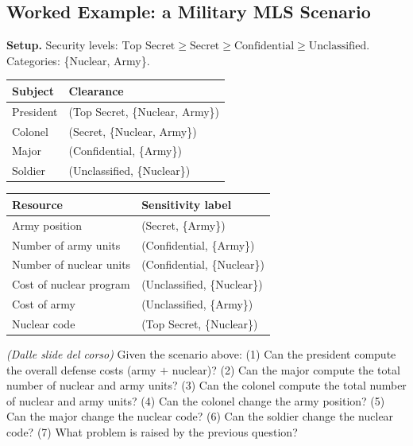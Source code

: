 \documentclass[12pt, a4paper]{article}
\newcounter{esercizio}[section]
\begin{document}
\subsection{Worked Example: a Military MLS Scenario}
\textbf{Setup.} Security levels: $\text{Top Secret} \geq \text{Secret} \geq \text{Confidential} \geq \text{Unclassified}$. Categories: \{Nuclear, Army\}.
\begin{center}
\begin{tabular}{@{}ll@{}}
\toprule
\textbf{Subject} & \textbf{Clearance} \\
\midrule
President & (Top Secret, \{Nuclear, Army\}) \\
Colonel & (Secret, \{Nuclear, Army\}) \\
Major & (Confidential, \{Army\}) \\
Soldier & (Unclassified, \{Nuclear\}) \\
\bottomrule
\end{tabular}
\qquad
\begin{tabular}{@{}ll@{}}
\toprule
\textbf{Resource} & \textbf{Sensitivity label} \\
\midrule
Army position & (Secret, \{Army\}) \\
Number of army units & (Confidential, \{Army\}) \\
Number of nuclear units & (Confidential, \{Nuclear\}) \\
Cost of nuclear program & (Unclassified, \{Nuclear\}) \\
Cost of army & (Unclassified, \{Army\}) \\
Nuclear code & (Top Secret, \{Nuclear\}) \\
\bottomrule
\end{tabular}
\end{center}

\begin{tcolorbox}[colback=lightergray!10, colframe=tocsec, title=\textbf{Esercizio \theesercizio}]
\textit{(Dalle slide del corso)} Given the scenario above: (1) Can the president compute the overall defense costs (army $+$ nuclear)? (2) Can the major compute the total number of nuclear and army units? (3) Can the colonel compute the total number of nuclear and army units? (4) Can the colonel change the army position? (5) Can the major change the nuclear code? (6) Can the soldier change the nuclear code? (7) What problem is raised by the previous question?
\end{tcolorbox}
\end{document}
